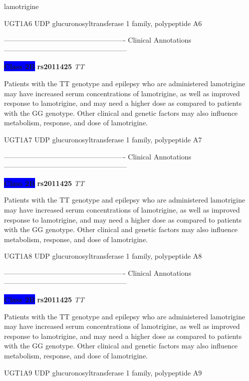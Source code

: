 \documentclass{resume} %
\begin{document}
\begin{rSection}{ lamotrigine }
\begin{rSubsection}{ UGT1A6 }{ UDP glucuronosyltransferase 1 family, polypeptide A6 }{}{}
\item[] ---------------------------------------------------- Clinical Annotations -----------------------------------------------------\newline
\item \textbf{\colorbox{blue} {Class 2B}} \textbf{ rs2011425 } \textit{ TT }
\item[] Patients with the TT genotype and epilepsy who are administered lamotrigine may have increased serum concentrations of lamotrigine, as well as improved response to lamotrigine, and may need a higher dose as compared to patients with the GG genotype. Other clinical and genetic factors may also influence metabolism, response, and dose of lamotrigine.  
\end{rSubsection}\begin{rSubsection}{ UGT1A7 }{ UDP glucuronosyltransferase 1 family, polypeptide A7 }{}{}
\item[]

\item[] ---------------------------------------------------- Clinical Annotations -----------------------------------------------------\newline
\item \textbf{\colorbox{blue} {Class 2B}} \textbf{ rs2011425 } \textit{ TT }
\item[] Patients with the TT genotype and epilepsy who are administered lamotrigine may have increased serum concentrations of lamotrigine, as well as improved response to lamotrigine, and may need a higher dose as compared to patients with the GG genotype. Other clinical and genetic factors may also influence metabolism, response, and dose of lamotrigine.  
\end{rSubsection}\begin{rSubsection}{ UGT1A8 }{ UDP glucuronosyltransferase 1 family, polypeptide A8 }{}{}
\item[]

\item[] ---------------------------------------------------- Clinical Annotations -----------------------------------------------------\newline
\item \textbf{\colorbox{blue} {Class 2B}} \textbf{ rs2011425 } \textit{ TT }
\item[] Patients with the TT genotype and epilepsy who are administered lamotrigine may have increased serum concentrations of lamotrigine, as well as improved response to lamotrigine, and may need a higher dose as compared to patients with the GG genotype. Other clinical and genetic factors may also influence metabolism, response, and dose of lamotrigine.  
\end{rSubsection}\begin{rSubsection}{ UGT1A9 }{ UDP glucuronosyltransferase 1 family, polypeptide A9 }{}{}
\item[]


\end{rSubsection}
\end{rSection}
\end{document}
